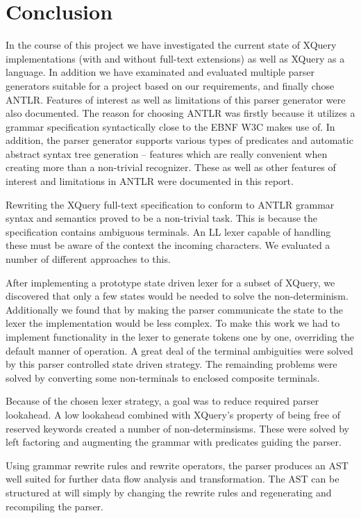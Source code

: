 \chapter{Conclusion}
\label{chapter:conclusion}

In the course of this project we have investigated the current state of XQuery implementations (with and without full-text extensions) as well as XQuery as a language. In addition we have examinated and evaluated multiple parser generators suitable for a project based on our requirements, and finally chose ANTLR. Features of interest as well as limitations of this parser generator were also documented.
The reason for choosing ANTLR was firstly because it utilizes a grammar
specification syntactically close to the EBNF W3C makes use of. In addition,
the parser generator supports various types of predicates and automatic abstract syntax tree generation -- features which are really convenient when creating more than a non-trivial recognizer. These as well as other features of interest and limitations in ANTLR were documented in this report.

Rewriting the XQuery full-text specification to conform to ANTLR grammar syntax and semantics proved to be a non-trivial task. This is because the specification contains ambiguous terminals. An LL lexer capable of handling these must be aware of the context the incoming characters. We evaluated a number of different approaches to this. 

After implementing a prototype state driven lexer for a subset of XQuery, we
discovered that only a few states would be needed to solve the non-determinism. Additionally we found that by making the parser communicate the state to the lexer the implementation would be less complex. To make this work we had to implement functionality in the lexer to generate tokens one by one, overriding the default manner of operation. A great deal of the terminal ambiguities were solved by this parser controlled state driven strategy. The remainding problems were solved by converting some non-terminals to enclosed composite terminals.

Because of the chosen lexer strategy, a goal was to reduce required parser
lookahead. A low lookahead combined with XQuery's property of being free of 
reserved keywords created a number of non-determinsisms. These were solved by left factoring and augmenting the grammar with predicates guiding the parser.

Using grammar rewrite rules and rewrite operators, the parser produces an AST well suited for further data flow analysis and transformation. The AST can be structured at will simply by changing the rewrite rules and regenerating and recompiling the parser.


